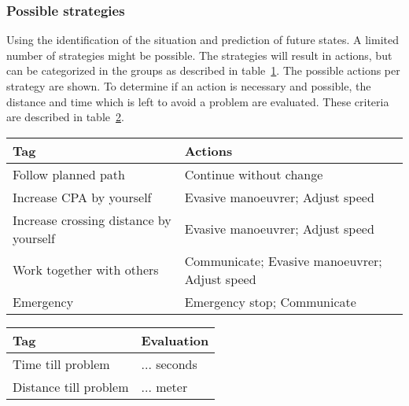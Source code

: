 \subsubsection{Possible strategies}
Using the identification of the situation and prediction of future states. A limited number of strategies might be possible. The strategies will result in actions, but can be categorized in the groups as described in table~\ref{tab:strategies}. The possible actions per strategy are shown. To determine if an action is necessary and possible, the distance and time which is left to avoid a problem are evaluated. These criteria are described in table~\ref{tab:manouvre-criteria}.
\begin{table}[H]
	\begin{tabular}{p{}|p{}}
		\toprule
		Tag & Actions \\
		\midrule
		Follow planned path & Continue without change\\
		Increase CPA by yourself & Evasive manoeuvrer; Adjust speed \\
		Increase crossing distance by yourself & Evasive manoeuvrer; Adjust speed \\
		Work together with others & Communicate; Evasive manoeuvrer; Adjust speed \\
		Emergency & Emergency stop; Communicate \\
		\bottomrule
	\end{tabular}
	
	\label{tab:strategies}
\end{table}

\begin{table}[H]
	\begin{tabular}{p{}|p{}}
		\toprule
		Tag & Evaluation \\
		\midrule
		Time till problem & ... seconds\\
		Distance till problem & ... meter \\
		\bottomrule
	\end{tabular}
	
	\label{tab:manouvre-criteria}
\end{table}

